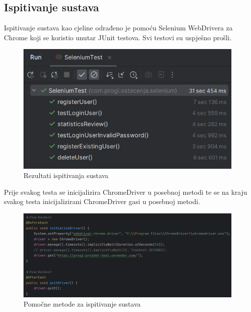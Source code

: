 			
			\subsection{Ispitivanje sustava}
		 	
		 	Ispitivanje sustava kao cjeline odrađeno je pomoću Selenium WebDrivera za Chrome koji se koristio unutar JUnit testova. Svi testovi su uspješno prošli.
		 	
		 	\begin{figure}[H]
		 		\includegraphics[width=\textwidth]{slike/SeleniumTestoviRez.png} %
		 		\caption{Rezultati ispitivanja sustava}
		 		\label{fig:SeleniumTestovi} %
		 	\end{figure}
		 	
		 	Prije svakog testa se inicijalizira ChromeDriver u posebnoj metodi te se na kraju svakog testa inicijalizirani ChromeDriver gasi u posebnoj metodi.
		 	
		 	\begin{figure}[H]
		 		\includegraphics[width=\textwidth]{slike/SeleniumTestoviPomocneMetode.png} %
		 		\caption{Pomočne metode za ispitivanje sustava}
		 		\label{fig:SeleniumTestoviPomocneMetode} %
		 	\end{figure}
		 	
